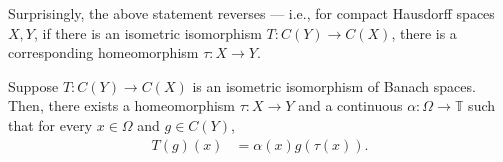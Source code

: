 \documentclass[10pt]{mypackage}
\begin{document}
Surprisingly, the above statement reverses --- i.e., for compact Hausdorff spaces $X,Y$, if there is an isometric isomorphism $T\colon C\left( Y \right)\rightarrow C\left( X \right)$, there is a corresponding homeomorphism $\tau\colon X\rightarrow Y$.
\begin{theorem}
  Suppose $T\colon C\left( Y \right)\rightarrow C\left( X \right)$ is an isometric isomorphism of Banach spaces. Then, there exists a homeomorphism $\tau\colon X\rightarrow Y$ and a continuous $\alpha\colon \Omega\rightarrow \mathbb{T}$ such that for every $x\in\Omega$ and $g\in C\left( Y \right)$,
  \begin{align*}
    T\left( g \right)\left( x \right) &= \alpha(x)g\left( \tau\left( x \right) \right).
  \end{align*}
\end{theorem}
\end{document}
